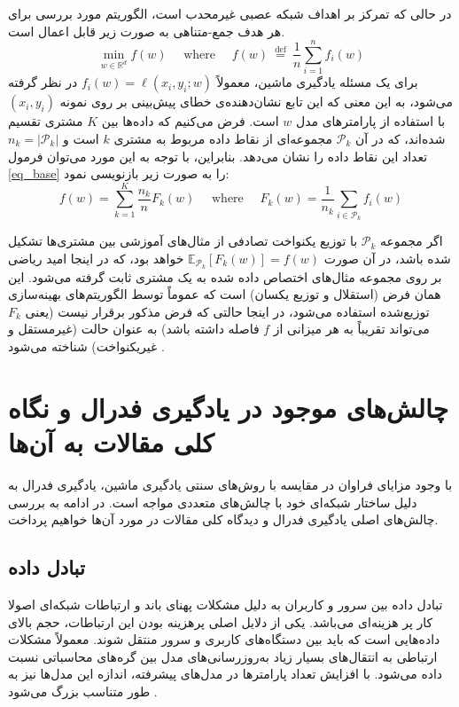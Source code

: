 در حالی که تمرکز بر اهداف شبکه عصبی غیرمحدب%
است، الگوریتم مورد بررسی برای هر هدف جمع-متناهی%
به صورت زیر قابل اعمال است.
\begin{equation}
	\min _{w \in \mathbb{R}^d} f(w) \quad \text { where } \quad f(w) \stackrel{\text { def }}{=} \frac{1}{n} \sum_{i=1}^n f_i(w)
	\label{eq_base}
\end{equation}
برای یک مسئله یادگیری ماشین، معمولاً
$f_i(w)=\ell\left(x_i, y_i ; w\right)$
در نظر گرفته می‌شود، به این معنی که این تابع نشان‌دهنده‌ی خطای پیش‌بینی بر روی نمونه
$(x_i, y_i)$
با استفاده از پارامترهای مدل
$w$
است. فرض می‌کنیم که داده‌ها بین
$K$
مشتری تقسیم شده‌اند، که در آن
$\mathcal{P}_k$
مجموعه‌ای از نقاط داده مربوط به مشتری
$k$
است و
$n_k=\left|\mathcal{P}_k\right|$
تعداد این نقاط داده را نشان می‌دهد. بنابراین، با توجه به این مورد می‌توان فرمول
\ref{eq_base}
را به صورت زیر بازنویسی نمود:
\begin{equation}
	f(w)=\sum_{k=1}^K \frac{n_k}{n} F_k(w) \quad \text { where } \quad F_k(w)=\frac{1}{n_k} \sum_{i \in \mathcal{P}_k} f_i(w)
\end{equation}

اگر مجموعه
$\mathcal{P}_k$
با توزیع یکنواخت تصادفی از مثال‌های آموزشی بین مشتری‌ها تشکیل شده باشد، در آن صورت
$\mathbb{E}_{\mathcal{P}_k}\left[F_k(w)\right]=f(w)$ 
خواهد بود، که در اینجا امید ریاضی بر روی مجموعه مثال‌های اختصاص داده شده به یک مشتری ثابت گرفته می‌شود. این همان فرض
(استقلال و توزیع یکسان)
است که عموماً توسط الگوریتم‌های بهینه‌سازی توزیع‌شده استفاده می‌شود، در اینجا حالتی که فرض مذکور برقرار نیست (یعنی
$F_k$
می‌تواند تقریباً به هر میزانی از
$f$
فاصله داشته باشد) به عنوان حالت
(غیرمستقل و غیریکنواخت)
شناخته می‌شود
\cite{mcmahan2017communication}.



\section{چالش‌های موجود در یادگیری فدرال و نگاه کلی مقالات به آن‌ها}
با وجود مزایای فراوان در مقایسه با روش‌های سنتی یادگیری ماشین، یادگیری فدرال به دلیل ساختار شبکه‌ای خود با چالش‌های متعددی مواجه است. در ادامه به بررسی چالش‌های اصلی یادگیری فدرال و دیدگاه کلی مقالات در مورد آن‌ها خواهیم پرداخت.


\subsection{تبادل داده}
تبادل داده بین سرور و کاربران به دلیل مشکلات پهنای باند و ارتباطات شبکه‌ای اصولا کار پر هزینه‌ای می‌باشد. یکی از دلایل اصلی پرهزینه بودن این ارتباطات، حجم بالای داده‌هایی است که باید بین دستگاه‌های کاربری و سرور منتقل شوند.
معمولاً مشکلات ارتباطی به انتقال‌های بسیار زیاد به‌روزرسانی‌های مدل بین گره‌های محاسباتی نسبت داده می‌شود. با افزایش تعداد پارامترها در مدل‌های پیشرفته، اندازه این مدل‌ها نیز به طور متناسب بزرگ می‌شود
\cite{wang2018atomo}.

